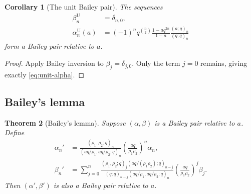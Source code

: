 \documentclass[11pt]{article}
\theoremstyle{blueplain}
\newtheorem{theorem}{Theorem}[section]
\newtheorem{corollary}[theorem]{Corollary}
\theoremstyle{bluedef}
\begin{document}
\begin{corollary}[The unit Bailey pair]\label{cor:unit-pair}
The sequences
\begin{align}
\beta_n^{\mathrm U}&=\delta_{n,0}, \label{eq:unit-beta}\\
\alpha_n^{\mathrm U}(a)
&=(-1)^nq^{\binom n2}
\frac{1-aq^{2n}}{1-a}\frac{(a;q)_n}{(q;q)_n} \label{eq:unit-alpha}
\end{align}
form a Bailey pair relative to $a$.
\end{corollary}

\begin{proof}
Apply Bailey inversion to $\beta_j=\delta_{j,0}$.  Only the term $j=0$ remains, giving exactly \eqref{eq:unit-alpha}.
\end{proof}

\subsection{Bailey's lemma}

\begin{theorem}[Bailey's lemma]\label{thm:bailey-lemma}
Suppose $(\alpha,\beta)$ is a Bailey pair relative to $a$.  Define
\begin{align}
\alpha_n'&=
\frac{(\rho_1,\rho_2;q)_n}{(aq/\rho_1,aq/\rho_2;q)_n}
\left(\frac{aq}{\rho_1\rho_2}\right)^n\alpha_n,
\label{eq:bailey-alpha-prime}\\
\beta_n'&=\sum_{j=0}^{n}
\frac{(\rho_1,\rho_2;q)_j(aq/(\rho_1\rho_2);q)_{n-j}}
{(q;q)_{n-j}(aq/\rho_1,aq/\rho_2;q)_n}
\left(\frac{aq}{\rho_1\rho_2}\right)^j\beta_j.
\label{eq:bailey-beta-prime}
\end{align}
Then $(\alpha',\beta')$ is also a Bailey pair relative to $a$.
\end{theorem}
\end{document}
